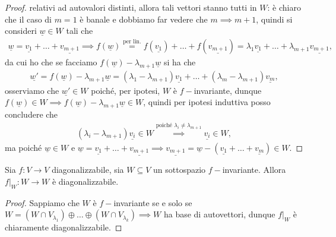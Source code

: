 \begin{proof}
    relativi ad autovalori distinti, allora tali vettori stanno tutti in $W$: è chiaro che il caso di $m=1$ è banale e dobbiamo far vedere che $m \implies m+1$, quindi si consideri $\underline{w} \in W$ tali che
    \begin{align}
        \underline{w} = \underline{v_1} + \ldots + \underline{v_{m+1}} \implies f(\underline{w}) \stackrel{\text{per lin.}}{=} f(\underline{v_1}) + \ldots + f(\underline{v_{m+1}}) = \lambda_1 \underline{v_1} + \ldots + \lambda_{m+1} \underline{v_{m+1}},
    \end{align}
    da cui ho che se facciamo $f(\underline{w}) - \lambda_{m+1} \underline{w}$ si ha che
    \begin{align}
        \underline{w'} = f(\underline{w}) - \lambda_{m+1} \underline{w} = (\lambda_1 - \lambda_{m+1}) \underline{v_1} + \ldots + (\lambda_{m} - \lambda_{m+1}) \underline{v_m},
    \end{align}
    osserviamo che $\underline{w'} \in W$ poiché, per ipotesi, $W$ è $f-$invariante, dunque $f(\underline{w}) \in W \implies f(\underline{w}) - \lambda_{m+1} \underline{w} \in W$, quindi per ipotesi induttiva posso concludere che
    \begin{align}
        (\lambda_i - \lambda_{m+1}) \underline{v_i} \in W \stackrel{\text{poiché } \lambda_i \neq \lambda_{m+1}}{\implies} \underline{v_i} \in W,
    \end{align}
    ma poiché $\underline{w} \in W$ e $\underline{w} = \underline{v_1} + \ldots + \underline{v_{m+1}} \implies \underline{v_{m+1}} = \underline{w} - (\underline{v_1} + \ldots + \underline{v_m}) \in W$.
\end{proof}
\begin{cor}
    Sia $f: V \to V$ diagonalizzabile, sia $W \subseteq V$ un sottospazio $f-$invariante. Allora $f|_{W}: W \to W$ è diagonalizzabile.
\end{cor}
\begin{proof}
    Sappiamo che $W$ è $f-$invariante se e solo se $W = (W \cap V_{\lambda_1}) \oplus \ldots \oplus (W \cap V_{\lambda_k}) \implies W$ ha base di autovettori, dunque $f|_{W}$ è chiaramente diagonalizzabile.
\end{proof}

